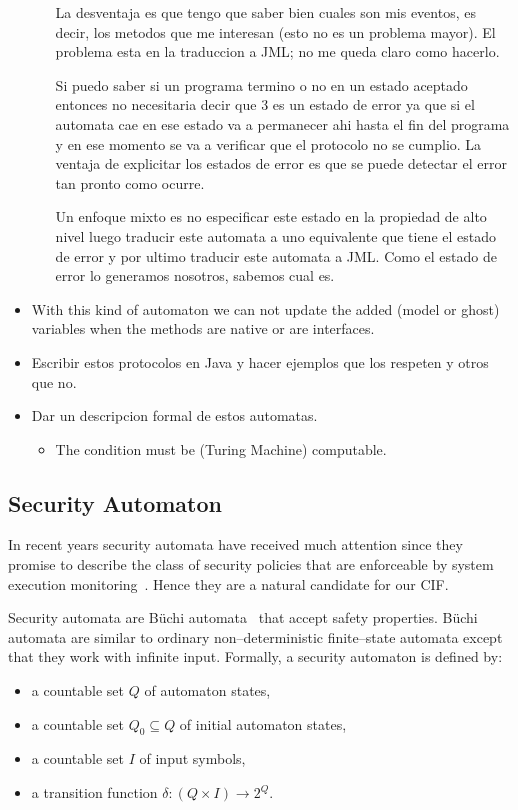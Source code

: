 \documentclass[a4paper,10pt]{article}
\begin{document}
\begin{itemize}
\begin{itemize}
La desventaja es que tengo que saber bien cuales son mis eventos, es decir, los
metodos que me interesan (esto no es un problema mayor). El problema esta en la
traduccion a JML; no me queda claro como hacerlo.

Si puedo saber si un programa termino o no en un estado aceptado entonces no
necesitaria decir que 3 es un estado de error ya que si el automata cae en ese
estado va a permanecer ahi hasta el fin del programa y en ese momento se va a
verificar que el protocolo no se cumplio. La ventaja de explicitar los estados
de error es que se puede detectar el error tan pronto como ocurre.

Un enfoque mixto es no especificar este estado en la propiedad de alto nivel
luego traducir este automata a uno equivalente que tiene el estado de error y
por ultimo traducir este automata a JML. Como el estado de error lo generamos
nosotros, sabemos cual es.
  \end{itemize}
  \item With this kind of automaton we can not update the added (model or ghost)
variables when the methods are native or are interfaces.
  \item Escribir estos protocolos en Java y hacer ejemplos que los respeten y
otros que no.
  \item Dar un descripcion formal de estos automatas. 
  \begin{itemize}
    \item The condition must be (Turing Machine) computable.
  \end{itemize}
\end{itemize}

\subsection{Security Automaton}\label{subsec:SA}
In recent years security automata have received much attention since they
promise to describe the class of security policies that are enforceable by
system execution monitoring~\cite{Schneider00}. Hence they are a natural
candidate for our CIF.

Security automata are B\"uchi automata~\cite{Schneider89} that accept safety
properties. B\"uchi automata are similar to ordinary non--deterministic
finite--state automata except that they work with infinite input. Formally, a
security automaton is defined by:
\begin{itemize}
  \item a countable set $Q$ of automaton states,
  \item a countable set $Q_0 \subseteq Q$ of initial automaton states,
  \item a countable set $I$ of input symbols,
  \item a transition function $\delta \colon (Q \times I) \rightarrow 2^Q$.
\end{itemize}
\end{document}
